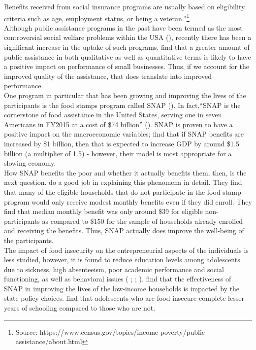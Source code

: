 \documentclass[12pt]{article}
\begin{document}
\begin{titlingpage}
Benefits received from social insurance programs are usually based on eligibility criteria such as age, employment status, or being a veteran."\footnote{Source: https://www.census.gov/topics/income-poverty/public-assistance/about.html}\\


Although public assistance programs in the past have been termed as the most controversial social welfare problems within the USA (\cite{Young1987}), recently there has been a significant increase in the uptake of such programs. \cite{schayek2011impact} find that a greater amount of public assistance in both qualitative as well as quantitative terms is likely to have a positive impact on performance of small businesses. Thus, if we account for the improved quality of the assistance, that does translate into improved performance.  \\

One program in particular that has been growing and improving the lives of the participants is the food stamps program called SNAP (\cite{bartfeld2015snap}). In fact,``SNAP is the cornerstone of food assistance in the United States, serving one in seven Americans in FY2015 at a cost of \$74 billion'' (\cite{ziliak2016modernizing}). SNAP is proven to have a positive impact on the macroeconomic variables; \cite{canning2019supplemental} find that if SNAP benefits are increased by \$1 billion, then that is expected to increase GDP by around \$1.5 billion (a multiplier of 1.5) - however, their model is most appropriate for a slowing economy.     \\

How SNAP benefits the poor and whether it actually benefits them, then, is the next question. \cite{daponte1999low} do a good job in explaining this phenomena in detail. They find that many of the eligible households that do not participate in the food stamp program would only receive modest monthly benefits even if they did enroll. They find that median monthly benefit was only around \$39 for eligible non-participants as compared to \$150 for the sample of households already enrolled and receiving the benefits. Thus, SNAP actually does improve the well-being of the participants.  \\


The impact of food insecurity on the entrepreneurial aspects of the individuals is less studied, however, it is found to reduce education levels among adolescents due to sickness, high absenteeism, poor academic performance and social functioning, as well as behavioral issues (\cite{frongillo2006food} ; \cite{jyoti2005food}; \cite{rose2008household}). \cite{tiehen2012state} find that the effectiveness of SNAP in improving the lives of the low-income households is impacted by the state policy choices. \cite{belachew2011food} find that adolescents who are food insecure complete lesser years of schooling compared to those who are not. \\


\end{titlingpage}
\end{document}
